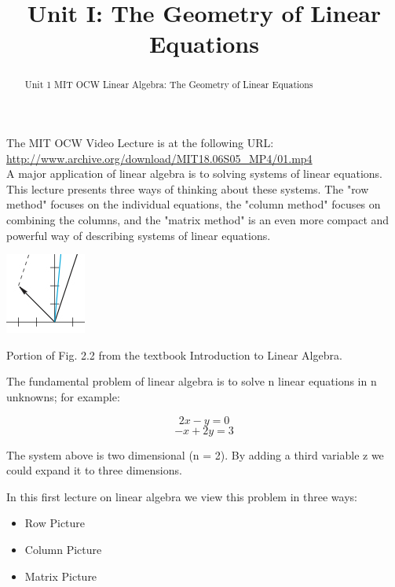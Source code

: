 \documentclass{ximera}
\title{Unit I: The Geometry of Linear Equations}
\begin{document}
\begin{abstract}
  Unit 1 MIT OCW Linear Algebra: The Geometry of Linear Equations
\end{abstract}\maketitle

\par

\noindent
The MIT OCW Video Lecture is at the following URL:\\
    \url{http://www.archive.org/download/MIT18.06S05_MP4/01.mp4}\\

\noindent
A major application of linear algebra is to solving systems of linear equations. This lecture presents three ways of thinking about these systems. The "row method" focuses on the individual equations, the "column method" focuses on combining the columns, and the "matrix method" is an even more compact and powerful way of describing systems of linear equations.

\par
\begin{center}
\includegraphics{1_1.jpg}

Portion of Fig. 2.2 from the textbook Introduction to Linear Algebra.
\end{center}

\noindent
The fundamental problem of linear algebra is to solve n linear equations in n unknowns; for example:
\begin{example}
\[2x-y = 0\]
\[-x+2y = 3\]
\end{example}
\noindent
The system above is two dimensional (n = 2). By adding a third variable z
we could expand it to three dimensions.

\noindent
In this first lecture on linear algebra we view this problem in three ways:

\begin{itemize}
\item Row Picture
\item Column Picture
\item Matrix Picture
\end{itemize}
\end{document}
